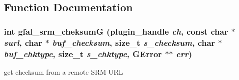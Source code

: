 \subsection{Function Documentation}
\subsubsection{\setlength{\rightskip}{0pt plus 5cm}int gfal\_\-srm\_\-cheksum\-G (plugin\_\-handle {\em ch}, const char $\ast$ {\em surl}, char $\ast$ {\em buf\_\-checksum}, size\_\-t {\em s\_\-checksum}, char $\ast$ {\em buf\_\-chktype}, size\_\-t {\em s\_\-chktype}, GError $\ast$$\ast$ {\em err})}\label{gfal__common__srm__checksum_8c_e65ec03caef1b84a84b4689991aa1eb2}


get checksum from a remote SRM URL 